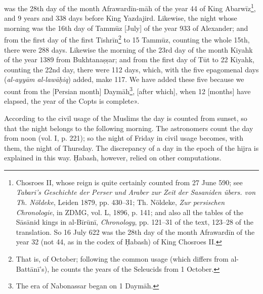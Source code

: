 \documentclass[11pt]{article}
\begin{document}
was the 28th day of the month Afrawardīn-māh of the year 44 of King Abarwīz\footnote{Chosroes II, whose reign is quite certainly counted from 27 June 590; see \emph{Tabari's Geschichte der Perser und Araber zur Zeit der Sasaniden übers. von Th. Nöldeke}, Leiden 1879, pp. 430–31; Th. Nöldeke, \emph{Zur persischen Chronologie}, in ZDMG, vol. L, 1896, p. 141; and also all the tables of the Sāsānid kings in al-Bīrūnī, \emph{Chronology}, pp. 121–31 of the text, 123–28 of the translation. So 16 July 622 was the 28th day of the month Afrawardīn of the year 32 (not 44, as in the codex of Ḥabash) of King Chosroes II.}, and 9 years and 338 days before King Yazdajird. Likewise, the night whose morning was the 16th day of Tammūz [July] of the year 933 of Alexander; and from the first day of the first Tishrīn\footnote{That is, of October; following the common usage (which differs from al-Battānī's), he counts the years of the Seleucids from 1 October.} to 15 Tammūz, counting the whole 15th, there were 288 days. Likewise the morning of the 23rd day of the month Kiyahk of the year 1389 from Bukhtanaṣṣar; and from the first day of Tūt to 22 Kiyahk, counting the 22nd day, there were 112 days, which, with the five epagomenal days (\emph{al-ayyām al-lawāḥiq}) added, make 117. We have added these five because we count from the [Persian month] Daymāh\footnote{The era of Nabonassar began on 1 Daymāh.}, [after which], when 12 [months] have elapsed, the year of the Copts is complete».\par
\par According to the civil usage of the Muslims the day is counted from sunset, so that the night belongs to the following morning. The astronomers count the day from noon (vol. I, p. 221); so the night of Friday in civil usage becomes, with them, the night of Thursday. The discrepancy of a day in the epoch of the hijra is explained in this way. Ḥabash, however, relied on other computations.\par
\end{document}
